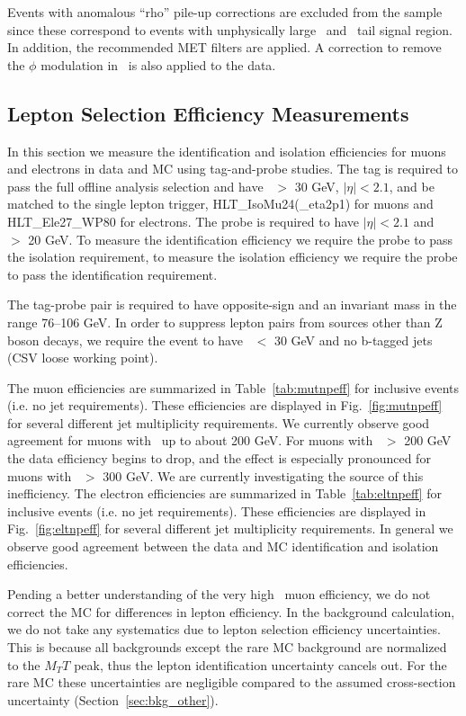 Events with anomalous ``rho'' pile-up corrections are excluded from the sample since these 
correspond to events with unphysically large \met\ and \mt\ tail
signal region. In addition, the recommended MET filters are applied. 
A correction to remove the $\phi$ modulation in \met\ is also applied
to the data.



\subsection{Lepton Selection Efficiency Measurements}
\label{sec:lepEff}

In this section we measure the identification and isolation efficiencies for muons and electrons in data and MC using tag-and-probe studies. 
The tag is required to pass the full offline analysis selection and have \pt\ $>$ 30 GeV, $|\eta|<2.1$, and be matched to the single
lepton trigger, HLT\_IsoMu24(\_eta2p1) for muons and HLT\_Ele27\_WP80 for electrons. 
The probe is required to have $|\eta|<2.1$ and \pt\ $>$ 20 GeV. To measure the identification efficiency we require the probe to pass the isolation requirement,
to measure the isolation efficiency we require the probe to pass the
identification requirement.

The tag-probe pair is required to have opposite-sign and an invariant mass in the range 76--106 GeV.
In order to suppress lepton pairs from sources other than Z boson
decays, we require the event to have \met\ $<$ 30 GeV and no b-tagged
jets (CSV loose working point).

The muon efficiencies are summarized in Table~\ref{tab:mutnpeff} for inclusive events (i.e. no jet requirements). These efficiencies are displayed in Fig.~\ref{fig:mutnpeff} for
several different jet multiplicity requirements. We currently observe good agreement for muons with \pt\ up to about 200 GeV. For muons with \pt\ $>$ 200 GeV the data efficiency
begins to drop, and the effect is especially pronounced for muons with \pt\ $>$ 300 GeV. We are currently investigating the source of this inefficiency.
The electron efficiencies are summarized in Table~\ref{tab:eltnpeff} for inclusive events (i.e. no jet requirements). These efficiencies are displayed in Fig.~\ref{fig:eltnpeff} for several different jet multiplicity requirements. In general we observe good agreement between the data and MC identification and isolation efficiencies.

Pending a better understanding of the very high \pt\ muon efficiency,  we
do not correct the MC for differences in lepton efficiency.  In the
background calculation, we do not take any systematics due to lepton
selection
efficiency uncertainties.  This is because all backgrounds except the 
rare MC background are normalized to the $M_TT$ peak, thus the lepton
identification uncertainty cancels out.  For the rare MC these
uncertainties
are negligible compared to the assumed cross-section uncertainty
(Section~\ref{sec:bkg_other}).




